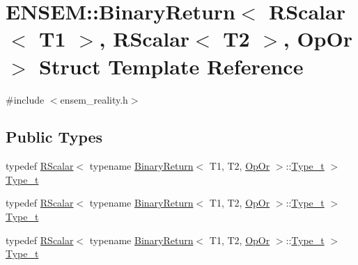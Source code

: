 \hypertarget{structENSEM_1_1BinaryReturn_3_01RScalar_3_01T1_01_4_00_01RScalar_3_01T2_01_4_00_01OpOr_01_4}{}\section{E\+N\+S\+EM\+:\+:Binary\+Return$<$ R\+Scalar$<$ T1 $>$, R\+Scalar$<$ T2 $>$, Op\+Or $>$ Struct Template Reference}
\label{structENSEM_1_1BinaryReturn_3_01RScalar_3_01T1_01_4_00_01RScalar_3_01T2_01_4_00_01OpOr_01_4}


{\ttfamily \#include $<$ensem\+\_\+reality.\+h$>$}

\subsection*{Public Types}
\begin{DoxyCompactItemize}
\item 
typedef \mbox{\hyperlink{classENSEM_1_1RScalar}{R\+Scalar}}$<$ typename \mbox{\hyperlink{structENSEM_1_1BinaryReturn}{Binary\+Return}}$<$ T1, T2, \mbox{\hyperlink{structENSEM_1_1OpOr}{Op\+Or}} $>$\+::\mbox{\hyperlink{structENSEM_1_1BinaryReturn_3_01RScalar_3_01T1_01_4_00_01RScalar_3_01T2_01_4_00_01OpOr_01_4_a55700962e5da25bd0a2bfbe68d9e17ce}{Type\+\_\+t}} $>$ \mbox{\hyperlink{structENSEM_1_1BinaryReturn_3_01RScalar_3_01T1_01_4_00_01RScalar_3_01T2_01_4_00_01OpOr_01_4_a55700962e5da25bd0a2bfbe68d9e17ce}{Type\+\_\+t}}
\item 
typedef \mbox{\hyperlink{classENSEM_1_1RScalar}{R\+Scalar}}$<$ typename \mbox{\hyperlink{structENSEM_1_1BinaryReturn}{Binary\+Return}}$<$ T1, T2, \mbox{\hyperlink{structENSEM_1_1OpOr}{Op\+Or}} $>$\+::\mbox{\hyperlink{structENSEM_1_1BinaryReturn_3_01RScalar_3_01T1_01_4_00_01RScalar_3_01T2_01_4_00_01OpOr_01_4_a55700962e5da25bd0a2bfbe68d9e17ce}{Type\+\_\+t}} $>$ \mbox{\hyperlink{structENSEM_1_1BinaryReturn_3_01RScalar_3_01T1_01_4_00_01RScalar_3_01T2_01_4_00_01OpOr_01_4_a55700962e5da25bd0a2bfbe68d9e17ce}{Type\+\_\+t}}
\item 
typedef \mbox{\hyperlink{classENSEM_1_1RScalar}{R\+Scalar}}$<$ typename \mbox{\hyperlink{structENSEM_1_1BinaryReturn}{Binary\+Return}}$<$ T1, T2, \mbox{\hyperlink{structENSEM_1_1OpOr}{Op\+Or}} $>$\+::\mbox{\hyperlink{structENSEM_1_1BinaryReturn_3_01RScalar_3_01T1_01_4_00_01RScalar_3_01T2_01_4_00_01OpOr_01_4_a55700962e5da25bd0a2bfbe68d9e17ce}{Type\+\_\+t}} $>$ \mbox{\hyperlink{structENSEM_1_1BinaryReturn_3_01RScalar_3_01T1_01_4_00_01RScalar_3_01T2_01_4_00_01OpOr_01_4_a55700962e5da25bd0a2bfbe68d9e17ce}{Type\+\_\+t}}
\end{DoxyCompactItemize}


